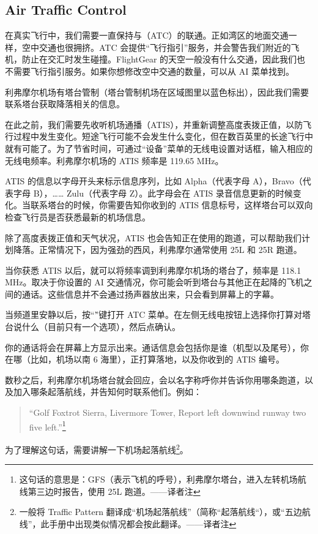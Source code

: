 \subsection{Air Traffic Control}

在真实飞行中，我们需要一直保持与（ATC）的联通。正如湾区的地面交通一样，空中交通也很拥挤。ATC 会提供“飞行指引”服务，并会警告我们附近的飞机，防止在交汇时发生碰撞。FlightGear 的天空一般没有什么交通，因此我们也不需要飞行指引服务。如果你想修改空中交通的数量，可以从 AI 菜单找到。

利弗摩尔机场有塔台管制（塔台管制机场在区域图里以蓝色标出），因此我们需要联系塔台获取降落相关的信息。

在此之前，我们需要先收听机场通播（ATIS），并重新调整高度表拨正值，以防飞行过程中发生变化。短途飞行可能不会发生什么变化，但在数百英里的长途飞行中就有可能了。为了节省时间，可通过“设备”菜单的无线电设置对话框，输入相应的无线电频率。利弗摩尔机场的 ATIS 频率是 119.65 MHz。

ATIS 的信息以字母开头来标示信息序列，比如 Alpha（代表字母 A），Bravo（代表字母 B），…… Zulu（代表字母 Z）。此字母会在 ATIS 录音信息更新的时候变化。当联系塔台的时候，你需要告知你收到的 ATIS 信息标号，这样塔台可以双向检查飞行员是否获悉最新的机场信息。

除了高度表拨正值和天气状况，ATIS 也会告知正在使用的跑道，可以帮助我们计划降落。正常情况下，因为强劲的西风，利弗摩尔通常使用 25L 和 25R 跑道。

当你获悉 ATIS 以后，就可以将频率调到利弗摩尔机场的塔台了，频率是 118.1 MHz。取决于你设置的 AI 交通情况，你可能会听到塔台与其他正在起降的飞机之间的通话。这些信息并不会通过扬声器放出来，只会看到屏幕上的字幕。

当频道里安静以后，按“\` ”键打开 ATC 菜单。在左侧无线电按钮上选择你打算对塔台说什么（目前只有一个选项），然后点确认。

你的通话将会在屏幕上方显示出来。通话信息会包括你是谁（机型以及尾号），你在哪（比如，机场以南 6 海里），正打算落地，以及你收到的 ATIS 编号。

数秒之后，利弗摩尔机场塔台就会回应，会以名字称呼你并告诉你用哪条跑道，以及加入哪条起落航线，并告知何时联系他们。例如：

\begin{quote}
``Golf Foxtrot Sierra, Livermore Tower, Report left downwind runway two five left.''\footnote{这句话的意思是：GFS（表示飞机的呼号），利弗摩尔塔台，进入左转机场航线第三边时报告，使用 25L 跑道。——译者注}
\end{quote}

为了理解这句话，需要讲解一下机场起落航线\footnote{一般将 Traffic Pattern 翻译成“机场起落航线”（简称“起落航线“），或“五边航线”，此手册中出现类似情况都会按此翻译。——译者注}。

